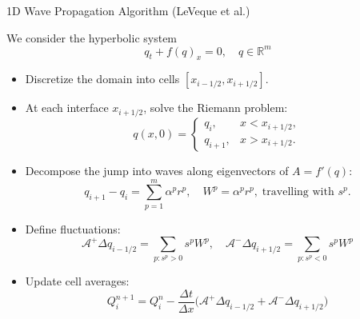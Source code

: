 


\begin{frame}{1D Wave Propagation Algorithm (LeVeque et al.)}
	\scriptsize
	
	We consider the hyperbolic system
	\[
	q_t + f(q)_x = 0, \quad q \in \mathbb{R}^m
	\]
	
	\begin{itemize}
		\item Discretize the domain into cells $[x_{i-1/2}, x_{i+1/2}]$.
		\item At each interface $x_{i+1/2}$, solve the Riemann problem:
		\[
		q(x,0) = 
		\begin{cases} 
			q_i, & x < x_{i+1/2}, \\ 
			q_{i+1}, & x > x_{i+1/2}.
		\end{cases}
		\]
		\item Decompose the jump into waves along eigenvectors of $A = f'(q)$:
		\[
		q_{i+1} - q_i = \sum_{p=1}^m \alpha^p r^p, 
		\quad W^p = \alpha^p r^p, \; \text{travelling with } s^p.
		\]
		\pause
		\item Define fluctuations:
		\[
		\mathcal{A}^+ \Delta q_{i-1/2} = \sum_{p: s^p>0} s^p W^p, \quad
		\mathcal{A}^- \Delta q_{i+1/2} = \sum_{p: s^p<0} s^p W^p
		\]
		\item Update cell averages:
		\[
		Q_i^{n+1} = Q_i^n - \frac{\Delta t}{\Delta x} 
		\Big( \mathcal{A}^+ \Delta q_{i-1/2} + \mathcal{A}^- \Delta q_{i+1/2} \Big)
		\]
	\end{itemize}
\end{frame}




